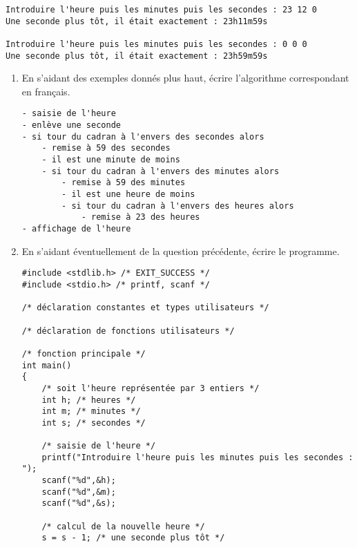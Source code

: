 \begin{small}
\begin{verbatim}
Introduire l'heure puis les minutes puis les secondes : 23 12 0
Une seconde plus tôt, il était exactement : 23h11m59s

Introduire l'heure puis les minutes puis les secondes : 0 0 0
Une seconde plus tôt, il était exactement : 23h59m59s
\end{verbatim}
\end{small}

\begin{enumerate}
\item En s'aidant des exemples donnés plus haut, écrire l'algorithme correspondant en français.
\begin{correction}
\begin{small}
\begin{verbatim}
- saisie de l'heure
- enlève une seconde
- si tour du cadran à l'envers des secondes alors
    - remise à 59 des secondes
    - il est une minute de moins
    - si tour du cadran à l'envers des minutes alors
        - remise à 59 des minutes
        - il est une heure de moins
        - si tour du cadran à l'envers des heures alors
            - remise à 23 des heures
- affichage de l'heure
\end{verbatim}
\end{small}
\end{correction}

\item En s'aidant éventuellement de la question précédente, écrire le programme.
  \begin{correction}
\begin{small}
\begin{verbatim}
#include <stdlib.h> /* EXIT_SUCCESS */
#include <stdio.h> /* printf, scanf */

/* déclaration constantes et types utilisateurs */

/* déclaration de fonctions utilisateurs */

/* fonction principale */
int main()
{
    /* soit l'heure représentée par 3 entiers */
    int h; /* heures */
    int m; /* minutes */
    int s; /* secondes */

    /* saisie de l'heure */
    printf("Introduire l'heure puis les minutes puis les secondes : ");
    scanf("%d",&h);
    scanf("%d",&m);
    scanf("%d",&s);
    
    /* calcul de la nouvelle heure */
    s = s - 1; /* une seconde plus tôt */


\end{verbatim}
\end{small}
\end{correction}
\end{enumerate}
